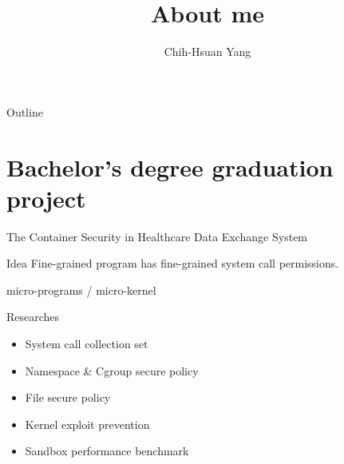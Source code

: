 \documentclass{beamer}
\title{About me}
\author{Chih-Hsuan Yang}
\begin{document}
\begin{frame}
    \maketitle
\end{frame}

\begin{frame}{Outline}
    \tableofcontents
\end{frame}

\section{Bachelor's degree graduation project}
\begin{frame}{The Container Security in Healthcare Data Exchange System}
    \begin{beamerboxesrounded}{Idea}
        Fine-grained program has fine-grained system call permissions.
    \end{beamerboxesrounded}
    micro-programs / micro-kernel
\end{frame}

\begin{frame}{Researches}
    \begin{itemize}
        \item System call collection set
        \item Namespace \& Cgroup secure policy
        \item File secure policy
        \item Kernel exploit prevention
        \item Sandbox performance benchmark
    \end{itemize}
\end{frame}
\end{document}

